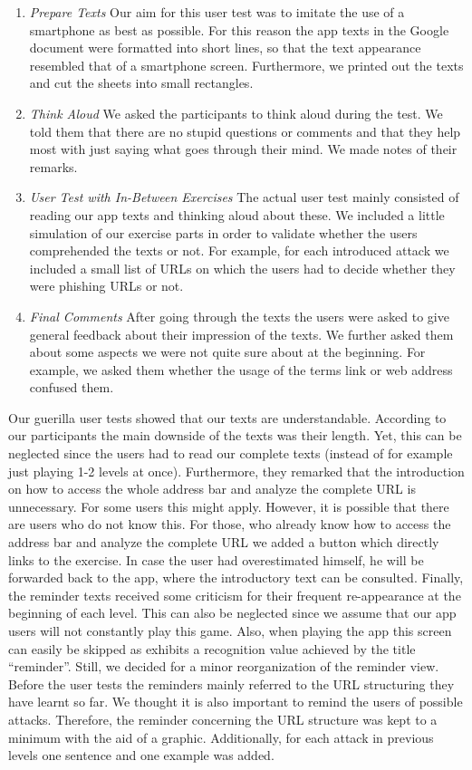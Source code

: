 \begin{enumerate}
	\item\textit{Prepare Texts} Our aim for this user test was to imitate the use of a smartphone as best as possible.
	For this reason the app texts in the Google document were formatted into short lines, so that the text appearance resembled that of a smartphone screen.
	Furthermore, we printed out the texts and cut the sheets into small rectangles.
	\item\textit{Think Aloud} We asked the participants to think aloud during the test. 
	We told them that there are no stupid questions or comments and that they help most with just saying what goes through their mind.
	We made notes of their remarks.
	\item\textit{User Test with In-Between Exercises} The actual user test mainly consisted of reading our app texts and thinking aloud about these.
	We included a little simulation of our exercise parts in order to validate whether the users comprehended the texts or not.
	For example, for each introduced attack we included a small list of URLs on which the users had to decide whether they were phishing URLs or not.
	\item\textit{Final Comments} After going through the texts the users were asked to give general feedback about their impression of the texts. 
	We further asked them about some aspects we were not quite sure about at the beginning. 
	For example, we asked them whether the usage of the terms link or web address confused them.
\end{enumerate}

Our guerilla user tests showed that our texts are understandable.
According to our participants the main downside of the texts was their length. 
Yet, this can be neglected since the users had to read our complete texts (instead of for example just playing 1-2 levels at once). 
Furthermore, they remarked that the introduction on how to access the whole address bar and analyze the complete URL is unnecessary. 
For some users this might apply. 
However, it is possible that there are users who do not know this. 
For those, who already know how to access the address bar and analyze the complete URL we added a button which directly links to the exercise. 
In case the user had overestimated himself, he will be forwarded back to the app, where the introductory text can be consulted. 
Finally, the reminder texts received some criticism for their frequent re-appearance at the beginning of each level. 
This can also be neglected since we assume that our app users will not constantly play this game. 
Also, when playing the app this screen can easily be skipped as exhibits a recognition value achieved by the title ``reminder''. 
Still, we decided for a minor reorganization of the reminder view. 
Before the user tests the reminders mainly referred to the URL structuring they have learnt so far. 
We thought it is also important to remind the users of possible attacks. 
Therefore, the reminder concerning the URL structure was kept to a minimum with the aid of a graphic. 
Additionally, for each attack in previous levels one sentence and one example was added. 

